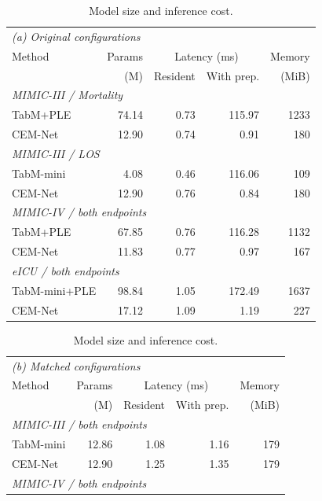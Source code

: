 \begin{table}[tp]
\centering\small
\setlength{\tabcolsep}{2.5pt}
\caption{Model size and inference cost.}
\label{tab:cost}
\label{tab:matched-cost}
\begin{minipage}[t]{0.49\textwidth}
\centering
\begin{tabular}[t]{@{}lrrrr@{}}
\toprule
\multicolumn{5}{l}{\textit{(a) Original configurations}} \\
Method & Params & \multicolumn{2}{c}{Latency (ms)} & Memory \\
& (M) & Resident & With prep. & (MiB) \\
\midrule
\multicolumn{5}{l}{\textit{MIMIC-III / Mortality}} \\
TabM+PLE & 74.14 & 0.73 & 115.97 & 1233 \\
CEM-Net & 12.90 & 0.74 & 0.91 & 180 \\
\multicolumn{5}{l}{\textit{MIMIC-III / LOS}} \\
TabM-mini & 4.08 & 0.46 & 116.06 & 109 \\
CEM-Net & 12.90 & 0.76 & 0.84 & 180 \\
\multicolumn{5}{l}{\textit{MIMIC-IV / both endpoints}} \\
TabM+PLE & 67.85 & 0.76 & 116.28 & 1132 \\
CEM-Net & 11.83 & 0.77 & 0.97 & 167 \\
\multicolumn{5}{l}{\textit{eICU / both endpoints}} \\
TabM-mini+PLE & 98.84 & 1.05 & 172.49 & 1637 \\
CEM-Net & 17.12 & 1.09 & 1.19 & 227 \\
\bottomrule
\end{tabular}
\end{minipage}\hfill
\begin{minipage}[t]{0.49\textwidth}
\centering
\begin{tabular}[t]{@{}lrrrr@{}}
\toprule
\multicolumn{5}{l}{\textit{(b) Matched configurations}} \\
Method & Params & \multicolumn{2}{c}{Latency (ms)} & Memory \\
& (M) & Resident & With prep. & (MiB) \\
\midrule
\multicolumn{5}{l}{\textit{MIMIC-III / both endpoints}} \\
TabM-mini & 12.86 & 1.08 & 1.16 & 179 \\
CEM-Net & 12.90 & 1.25 & 1.35 & 179 \\
\multicolumn{5}{l}{\textit{MIMIC-IV / both endpoints}} \\

\end{tabular}
\end{minipage}
\end{table}
